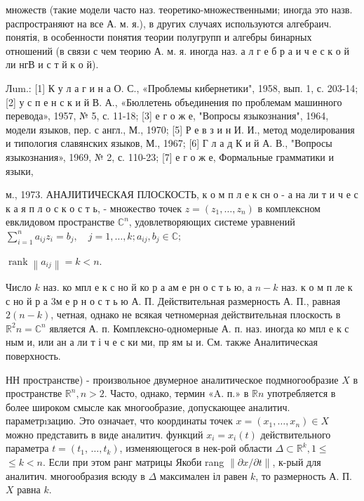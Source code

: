 \documentclass[10pt]{article}
\begin{document}
множеств (такие модели часто наз. теоретико-множественными; иногда это назв. распространяют на все А. м. я.), в других случаях используются алгебраич. понятія, в особенности понятия теории полугрупп и алгебры бинарных отношений (в связи с чем теорию А. м. я. иногда наз. а л г е б р а и ч е с к о й ли нгВ и с т й к о й).



Лum.: [1] К у л а г и н а О. С., «Проблемы кибернетики", 1958, вып. 1, с. 203-14; [2] у с п е н с к и й В. А., «Бюллетень объединения по проблемам машинного перевода», 1957, № 5, с. 11-18; [3] е г о ж е, "Вопросы языкознания", 1964, модели языков, пер. с англ., М., 1970; [5] Р е в з и н И. И., метод моделирования и типология славянских языков, М., 1967; [6] Г л а д К и й А. В., "Вопросы языкознания», 1969, № 2, с. 110-23; [7] е г о ж е, Формальные грамматики и языки,

м., 1973. АНАЈІИТИЧЕСКАЯ ПЛОСКОСТЬ, к о м п л е к сн $о$ - а на ли т и ч е с к а я п л о с к о с т ь, - множество точек $z=\left(z_{1}, \ldots, z_{n}\right)$ в комплексном евклидовом пространстве $\mathbb{C}^{n}$, удовлетворяющих системе уравнений $\sum_{i=1}^{n} a_{i j} z_{i}=b_{j}, \quad j=1, \ldots, k ; a_{i j}, b_{j} \in \mathbb{C} ;$



$\operatorname{rank}\left\|a_{i j}\right\|=k<n$.



Число $k$ наз. ко мпл е к с но й ко р а $а м$ е рн о с т ь ю, а $n-k$ наз. к о м п ле к с но й р а 3м е р н о с т ь ю А. П. Действительная размерность А. П., равная $2(n-k)$, четная, однако не всякая четномерная действительная плоскость в $\mathbb{R}^{2} n=\mathbb{C}^{n}$ является А. п. Комплексно-одномерные А. п. наз. иногда ко мпл е к с ным и, или ан а ли т і ч е с ки ми, пр ям ы и. См. также Аналитическая поверхность.



НН пространстве) - произвольное двумерное аналитическое подмногообразие $X$ в пространстве $\mathbb{R}^{n}, n>2$. Часто, однако, термин «A. п.» в $\mathbb{R} n$ употребляется в более широком смысле как многообразие, допускающее аналитич. параметрıзацию. Это означает, что координаты точек $x=\left(x_{1}, \ldots, x_{n}\right) \in X$ можно представить в виде аналитич. функций $x_{i}=x_{i}(t)$ действительного параметра $t=\left(t_{1}\right.$, $\left.\ldots, t_{k}\right)$, изменяющегося в нек-рой области $\Delta \subset \mathbb{R}^{k}, 1 \leqslant$ $\leqslant k<n$. Если при этом ранг матрицы Якоби rang $\|\partial x / \partial t\|$, к-рый для аналитич. многообразия всюду в $\Delta$ максимален іл равен $k$, то размерность А. П. $X$ равна $k$.
\end{document}
